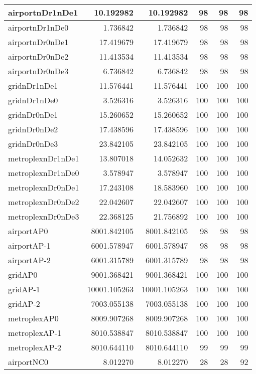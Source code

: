\begin{longtable}{|l|r|r|r|r|r|}
\endlastfoot
airportnDr1nDe1 & 10.192982 & 10.192982 & 98 & 98 & 98 \\ \hline
airportnDr1nDe0 & 1.736842 & 1.736842 & 98 & 98 & 98 \\ \hline
airportnDr0nDe1 & 17.419679 & 17.419679 & 98 & 98 & 98 \\ \hline
airportnDr0nDe2 & 11.413534 & 11.413534 & 98 & 98 & 98 \\ \hline
airportnDr0nDe3 & 6.736842 & 6.736842 & 98 & 98 & 98 \\ \hline
gridnDr1nDe1 & 11.576441 & 11.576441 & 100 & 100 & 100 \\ \hline
gridnDr1nDe0 & 3.526316 & 3.526316 & 100 & 100 & 100 \\ \hline
gridnDr0nDe1 & 15.260652 & 15.260652 & 100 & 100 & 100 \\ \hline
gridnDr0nDe2 & 17.438596 & 17.438596 & 100 & 100 & 100 \\ \hline
gridnDr0nDe3 & 23.842105 & 23.842105 & 100 & 100 & 100 \\ \hline
metroplexnDr1nDe1 & 13.807018 & 14.052632 & 100 & 100 & 100 \\ \hline
metroplexnDr1nDe0 & 3.578947 & 3.578947 & 100 & 100 & 100 \\ \hline
metroplexnDr0nDe1 & 17.243108 & 18.583960 & 100 & 100 & 100 \\ \hline
metroplexnDr0nDe2 & 22.042607 & 22.042607 & 100 & 100 & 100 \\ \hline
metroplexnDr0nDe3 & 22.368125 & 21.756892 & 100 & 100 & 100 \\ \hline
airportAP0 & 8001.842105 & 8001.842105 & 98 & 98 & 98 \\ \hline
airportAP-1 & 6001.578947 & 6001.578947 & 98 & 98 & 98 \\ \hline
airportAP-2 & 6001.315789 & 6001.315789 & 98 & 98 & 98 \\ \hline
gridAP0 & 9001.368421 & 9001.368421 & 100 & 100 & 100 \\ \hline
gridAP-1 & 10001.105263 & 10001.105263 & 100 & 100 & 100 \\ \hline
gridAP-2 & 7003.055138 & 7003.055138 & 100 & 100 & 100 \\ \hline
metroplexAP0 & 8009.907268 & 8009.907268 & 100 & 100 & 100 \\ \hline
metroplexAP-1 & 8010.538847 & 8010.538847 & 100 & 100 & 100 \\ \hline
metroplexAP-2 & 8010.644110 & 8010.644110 & 99 & 99 & 99 \\ \hline
airportNC0 & 8.012270 & 8.012270 & 28 & 28 & 92 \\ \hline

\end{longtable}
